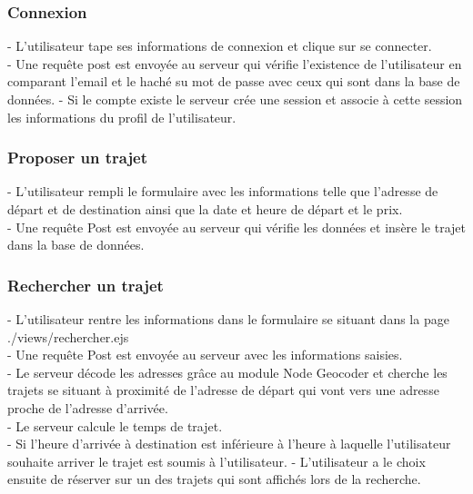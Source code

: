 \documentclass{article}
\begin{document}
\subsubsection{Connexion}
- L'utilisateur tape ses informations de connexion et clique sur se connecter. \\
- Une requête post est envoyée au serveur qui vérifie l'existence de l'utilisateur en comparant l'email et le haché su mot de passe avec ceux qui sont dans la base de données.
- Si le compte existe le serveur crée une session et associe à cette session les informations du profil de l'utilisateur.

\subsubsection{Proposer un trajet}
- L'utilisateur rempli le formulaire avec les informations telle que l'adresse de départ et de destination ainsi que la date et heure de départ et le prix. \\
- Une requête Post est envoyée au serveur qui vérifie les données et insère le trajet dans la base de données. \\
\subsubsection{Rechercher un trajet}
- L’utilisateur rentre les informations dans le formulaire se situant dans la page ./views/rechercher.ejs \\
- Une requête Post est envoyée au serveur avec les informations saisies. \\
- Le serveur décode les adresses grâce au module Node Geocoder et cherche les trajets se situant à proximité de l'adresse de départ qui vont vers une adresse proche de l'adresse d'arrivée. \\
- Le serveur calcule le temps de trajet. \\
- Si l'heure d'arrivée à destination est inférieure à l'heure à laquelle l'utilisateur souhaite arriver le trajet est soumis à l'utilisateur.
- L'utilisateur a le choix ensuite de réserver sur un des trajets qui sont affichés lors de la recherche.
\end{document}
